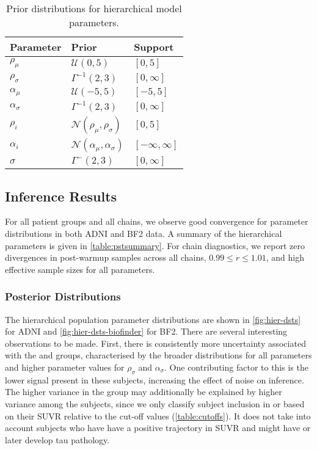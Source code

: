 \begin{table}[h]
    \centering
    \begin{tabular}{lll}
        \hline
        \textbf{Parameter} & \textbf{Prior} & \textbf{Support} \\
        \hline
        $\rho_\mu$ & $\mathcal{U}(0, 5)$ & $[0, 5]$ \\
        $\rho_\sigma$ & $\Gamma^{-1}(2, 3)$ & $[0, \infty]$ \\
        $\alpha_\mu$ & $\mathcal{U}(-5, 5)$ & $[-5, 5]$ \\
        $\alpha_\sigma$ & $\Gamma^{-1}(2, 3)$ & $[0, \infty]$ \\
        $\rho_i$ & $\mathcal{N}(\rho_\mu, \rho_\sigma)$ & $[0, 5]$ \\
        $\alpha_i$ & $\mathcal{N}(\alpha_\mu, \alpha_\sigma)$ & $[-\infty, \infty]$ \\
        $\sigma$ & $\Gamma^{-}(2,3)$ & $[0, \infty]$\\
        \hline
    \end{tabular}
    \caption{Prior distributions for hierarchical model parameters.}
    \label{table:priors}
\end{table}

\subsection*{Inference Results}

For all patient groups and all chains, we observe good convergence for parameter
distributions in both ADNI and BF2 data. A summary of the hierarchical
parameters is given in \cref{table:pstsummary}. For chain diagnostics, we
report zero divergences in post-warmup samples across all chains, $0.99 \leq
\hat{r} \leq 1.01$, and high effective sample sizes for all parameters.

\subsubsection*{Posterior Distributions}
The hierarchical population parameter distributions are shown in 
\cref{fig:hier-dsts} for ADNI and \cref{fig:hier-dsts-biofinder} for BF2.
There are several interesting observations to be made. First, there is
consistently more uncertainty associated with the \ABN and \ABP \TPN groups,
characterised by the broader distributions for all parameters and higher
parameter values for $\rho_\sigma$ and $\alpha_\sigma$. One contributing factor
to this is the lower signal present in these subjects, increasing the
effect of noise on inference. The higher variance in the \ABP \TPN group may
additionally be explained by higher variance among the subjects, since we only
classify subject inclusion in \TPP or \TPN based on their SUVR relative to the
cut-off values (\cref{table:cutoffs}). It does not take into account
subjects who have have a positive trajectory in \TP SUVR and might have or later
develop tau pathology.

